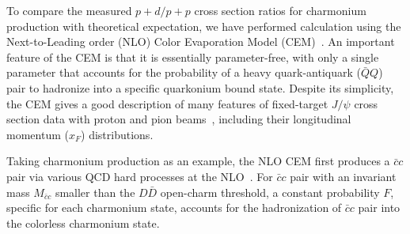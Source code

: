 \documentclass[reprint,aps,unsortedaddress,superscriptaddress,prd,floatfix,showpacs,linenumbers]{revtex4-2}
\begin{document}

To compare the measured $p+d / p+p$ cross section ratios for charmonium 
production with theoretical expectation, we have performed calculation
using the Next-to-Leading order (NLO) Color Evaporation 
Model (CEM)~\cite{fritzsch1977}.
An important feature of the CEM is that it is essentially parameter-free, 
with only a single parameter that accounts for the probability of a
heavy quark-antiquark ($\bar Q Q$) pair to hadronize into a specific 
quarkonium bound state. Despite its simplicity, the CEM
gives a good description of many features of fixed-target $J/\psi$ 
cross section data with proton and pion beams~\cite{schuler1996,chang2020}, 
including their longitudinal momentum ($x_F$) distributions.

Taking charmonium production as an example, the NLO CEM first
produces a $\bar c c$ pair via various QCD hard processes at 
the NLO~\cite{mangano1993}.
For $\bar c c$ pair with an invariant mass $M_{\bar c c}$ smaller than 
the $D \bar D$ open-charm threshold, a
constant probability $F$, specific for each charmonium state,
accounts for the hadronization of $\bar c c$ pair into the colorless
charmonium state. 

\end{document}
